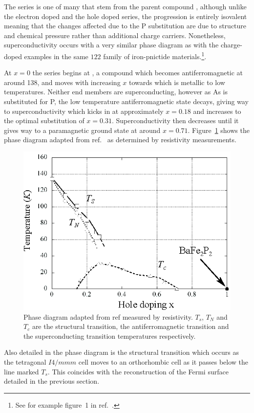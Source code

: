 The \BaFeAsP{} series is one of many that stem from the parent compound \BaFeAs, although unlike the electron doped \BaCoFeAs{} and the hole doped \BaKFeAs{} series, the \BaFeAsP{} progression is entirely isovalent meaning that the changes affected due to the P substitution are due to structure and chemical pressure rather than additional charge carriers. Nonetheless, superconductivity occurs with a very similar phase diagram as with the charge-doped examples in the same $122$ family of iron-pnictide materials.\footnote{See for example figure~1 in ref.~\cite{Paglione2010}.}. 

At $x=0$ the \BaFeAsP{} series begins at \BaFeAs, a compound which becomes antiferromagnetic at around \unit{138}{\kelvin}, and moves with increasing $x$ towards \BaFeP{} which is metallic to low temperatures. Neither end members are superconducting, however as As is substituted for P, the low temperature antiferromagnetic state decays, giving way to superconductivity which kicks in at approximately $x=0.18$ and increases to the optimal substitution of $x=0.31$. Superconductivity then decreases until it gives way to a paramagnetic ground state at around $x=0.71$. Figure~\ref{Fig:Intro:PhaseDiagram} shows the phase diagram adapted from ref.~\cite{Nakai2010a} as determined by resistivity measurements. 
\begin{figure}[htbp]
    \begin{center}
        \includegraphics[scale=1.0]{Chapter-Introduction/Figures/PhaseDiagram/PhaseDiagram}
        \caption{Phase diagram adapted from ref \cite{Nakai2010a} measured by resistivity. $T_s$, $T_N$ and $T_c$ are the structural transition, the antiferromagnetic transition and the superconducting transition temperatures respectively.}
        \label{Fig:Intro:PhaseDiagram}
    \end{center}
\end{figure}
Also detailed in the phase diagram is the structural transition which occurs as the tetragonal $I4/mmm$ cell moves to an orthorhombic cell as it passes below the line marked $T_s$. This coincides with the reconstruction of the Fermi surface detailed in the previous section.

